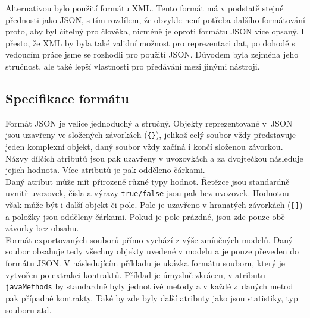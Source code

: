			Alternativou bylo použití formátu XML. Tento formát má v podstatě stejné přednosti jako JSON, s tím rozdílem, že obvykle není potřeba dalšího formátování proto, aby byl čitelný pro člověka, nicméně je oproti formátu JSON více opsaný. I přesto, že XML by byla také validní možnost pro reprezentaci dat, po dohodě s vedoucím práce jsme se rozhodli pro použití JSON. Důvodem byla zejména jeho stručnost, ale také lepší vlastnosti pro předávání mezi jinými nástroji.
			
		\subsection{Specifikace formátu}
			Formát JSON \cite{jsonSyntax} je velice jednoduchý a stručný. Objekty reprezentované v~JSON jsou uzavřeny ve složených závorkách (\texttt{\{\}}), jelikož celý soubor vždy představuje jeden komplexní objekt, daný soubor vždy začíná i končí složenou závorkou. Názvy dílčích atributů jsou pak uzavřeny v uvozovkách a za dvojtečkou následuje jejich hodnota. Více atributů je pak odděleno čárkami.\\
			
			Daný atribut může mít přirozeně různé typy hodnot. Řetězce jsou standardně uvnitř uvozovek, čísla a výrazy \texttt{true/false} jsou pak bez uvozovek. Hodnotou však může být i další objekt či pole. Pole je uzavřeno v hranatých závorkách (\texttt{[]}) a položky jsou odděleny čárkami. Pokud je pole prázdné, jsou zde pouze obě závorky bez obsahu.\\
			
			Formát exportovaných souborů přímo vychází z výše zmíněných modelů. Daný soubor obsahuje tedy všechny objekty uvedené v modelu a je pouze převeden do formátu JSON. V následujícím příkladu je ukázka formátu souboru, který je vytvořen po extrakci kontraktů. Příklad je úmyslně zkrácen, v atributu \texttt{javaMethods} by standardně byly jednotlivé metody a v každé z~daných metod pak případné kontrakty. Také by zde byly další atributy jako jsou statistiky, typ souboru atd.\\
							
